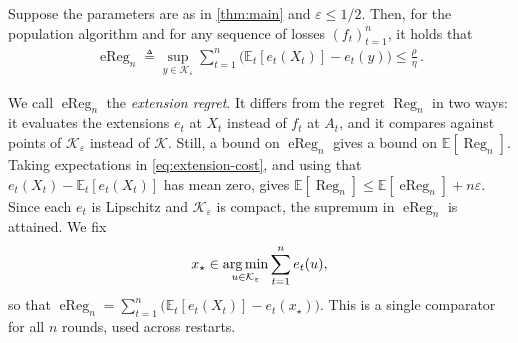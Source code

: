 \documentclass[12pt,cleveref]{jmlr}
\newcommand{\E}{\mathbb E}
\newcommand{\K}{\mathcal K}
\newcommand{\Reg}{\operatorname{Reg}}
\newcommand{\eReg}{\operatorname{eReg}}
\newcommand{\argmin}{\operatornamewithlimits{arg\,min}}
\newcommand{\1}{\mathbf 1}
\newcommand{\eps}{\varepsilon}
\newcommand{\kevin}[1]{\todo[color=green!20,size=\tiny]{Kevin: #1}}
\begin{document}
\begin{proposition}\label{pop:oracle}
    Suppose the parameters are as in \cref{thm:main} and $\eps\leq 1/2$. Then, for the population algorithm and for any sequence of losses $(f_t)_{t=1}^n$, it holds that
    \begin{align}
        \eReg_n \triangleq
        \sup_{y\in\K_\eps}\sum_{t=1}^n\bigl(\E_t[e_t(X_t)]-e_t(y)\bigr)\leq \frac{\rho}{\eta}\,.
    \end{align}
\end{proposition}
We call $\eReg_n$ the \textit{extension regret}. It differs from the regret $\Reg_n$ in two ways: it evaluates the extensions $e_t$ at $X_t$ instead of $f_t$ at $A_t$, and it compares against points of $\K_\eps$ instead of $\K$.
Still, a bound on $\eReg_n$ gives a bound on $\E[\Reg_n]$. Taking expectations in \cref{eq:extension-cost}, and using that $e_t(X_t)-\E_t[e_t(X_t)]$ has mean zero, gives $\E[\Reg_n]\leq\E[\eReg_n]+n\eps$.
Since each $e_t$ is Lipschitz and $\K_\eps$ is compact, the supremum in $\eReg_n$ is attained. We fix
\begin{align}
    x_\star\in\argmin_{u\in\K_\eps}\sum_{t=1}^n e_t(u),
\end{align}
so that $\eReg_n=\sum_{t=1}^n\bigl(\E_t[e_t(X_t)]-e_t(x_\star)\bigr)$. This is a single comparator for all $n$ rounds, used across restarts.
\end{document}

